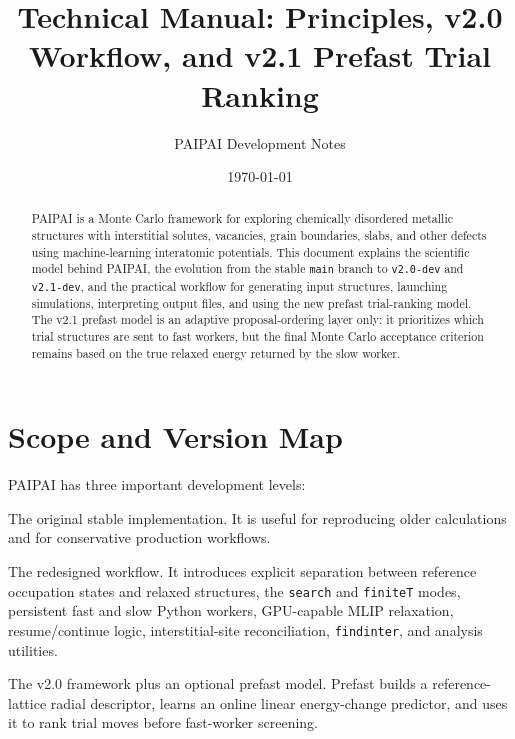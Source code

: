 \documentclass[11pt]{article}
\title{\PAIPAI{} Technical Manual: Principles, v2.0 Workflow, and v2.1 Prefast Trial Ranking}
\author{PAIPAI Development Notes}
\date{\today}
\newcommand{\PAIPAI}{\textsc{PAIPAI}}
\begin{document}
\maketitle

\begin{abstract}
\PAIPAI{} is a Monte Carlo framework for exploring chemically disordered metallic structures with interstitial solutes, vacancies, grain boundaries, slabs, and other defects using machine-learning interatomic potentials.
This document explains the scientific model behind \PAIPAI{}, the evolution from the stable \texttt{main} branch to \texttt{v2.0-dev} and \texttt{v2.1-dev}, and the practical workflow for generating input structures, launching simulations, interpreting output files, and using the new prefast trial-ranking model.
The v2.1 prefast model is an adaptive proposal-ordering layer only: it prioritizes which trial structures are sent to fast workers, but the final Monte Carlo acceptance criterion remains based on the true relaxed energy returned by the slow worker.
\end{abstract}

\tableofcontents
\newpage

\section{Scope and Version Map}

\PAIPAI{} has three important development levels:

\begin{description}[leftmargin=2.8cm,style=nextline]
\item[\texttt{main}]
The original stable implementation. It is useful for reproducing older calculations and for conservative production workflows.

\item[\texttt{v2.0-dev}]
The redesigned workflow. It introduces explicit separation between reference occupation states and relaxed structures, the \texttt{search} and \texttt{finiteT} modes, persistent fast and slow Python workers, GPU-capable MLIP relaxation, resume/continue logic, interstitial-site reconciliation, \texttt{findinter}, and analysis utilities.

\item[\texttt{v2.1-dev}]
The v2.0 framework plus an optional prefast model. Prefast builds a reference-lattice radial descriptor, learns an online linear energy-change predictor, and uses it to rank trial moves before fast-worker screening.
\end{description}
\end{document}
